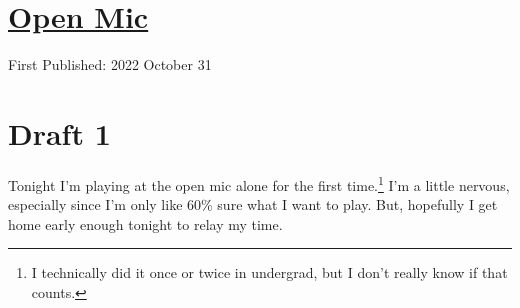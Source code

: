 \documentclass[12pt]{article}[titlepage]
\newcommand{\1}{\={a}}
\newcommand{\2}{\={e}}
\newcommand{\3}{\={\i}}
\newcommand{\4}{\=o}
\newcommand{\5}{\=u}
\newcommand{\6}{\={A}}
\renewcommand{\,}{\textsuperscript{,}}
\begin{document}
\doublespacing
\section{\href{open-mic-3.html}{Open Mic}}
First Published: 2022 October 31


\section{Draft 1}
Tonight I'm playing at the open mic alone for the first time.\footnote{I technically did it once or twice in undergrad, but I don't really know if that counts.}
I'm a little nervous, especially since I'm only like 60\% sure what I want to play.
But, hopefully I get home early enough tonight to relay my time.
\end{document}
